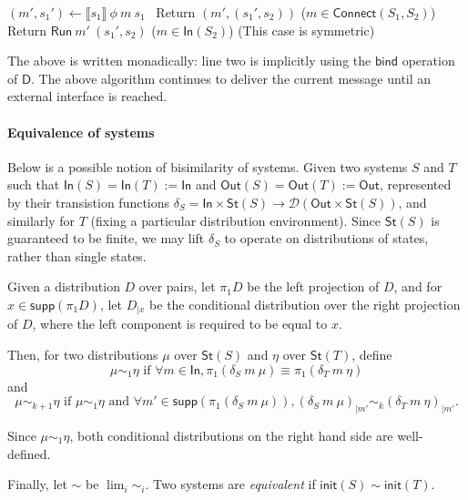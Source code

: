 \documentclass{article}
\begin{document}
\begin{algorithm}
\begin{algorithmic}[1]
        \State $(m', s_1') \leftarrow \llbracket s_1 \rrbracket\ \phi\ m\ s_1$
         \
            \State Return $(m', (s_1', s_2))$
        \Else 
            \State ($m \in \textsf{Connect}(S_1, S_2)$) 
            \State Return $\textsf{Run}\ m'\ (s_1', s_2)$
        \EndIf
    \Else
        \State ($m \in \textsf{In}(S_2)$)
        \State (This case is symmetric)
    \EndIf
\end{algorithmic}
\end{algorithm}

The above is written monadically: line two is implicitly using the $\textsf{bind}$ operation of $\textsf{D}$. The above algorithm continues to deliver the current message until an external interface is reached.


\paragraph{Equivalence of systems}

Below is a possible notion of bisimilarity of systems. Given two systems $S$ and $T$ such that $\textsf{In}(S) = \textsf{In}(T) := \textsf{In}$ and $\textsf{Out}(S) = \textsf{Out}(T) := \textsf{Out}$, represented by their transistion functions $\delta_S = \textsf{In} \times \textsf{St}(S) \to \mathcal{D} (\textsf{Out} \times \textsf{St}(S))$, and similarly for $T$ (fixing a particular distribution environment).
Since $\textsf{St}(S)$ is guaranteed to be finite, we may lift $\delta_S$ to operate on distributions of states, rather than single states.

Given a distribution $D$ over pairs, let $\pi_1 D$ be the left projection of $D$, and for $x \in \textsf{supp}(\pi_1 D)$, let $D_{|x}$ be the conditional distribution over the right projection of $D$, where the left component is required to be equal to $x$.

Then, for two distributions $\mu$ over $\textsf{St}(S)$ and $\eta$ over $\textsf{St}(T)$, define
\[ \mu \sim_1 \eta \text { if } \forall m \in \textsf{In}, \pi_1 (\delta_S\ m\ \mu) \equiv \pi_1 (\delta_T\ m\ \eta)\]
and
\[
    \mu \sim_{k+1} \eta \text { if } \mu \sim_1 \eta \text{ and } \forall m' \in \textsf{supp} (\pi_1 (\delta_S\ m\ \mu)), (\delta_S\ m\ \mu)_{|m'} \sim_k (\delta_T\ m\ \eta)_{|m'}.
\]

Since $\mu \sim_1 \eta$, both conditional distributions on the right hand side are well-defined.

Finally, let $\sim$ be $\lim_i \sim_i$. Two systems are \emph{equivalent} if $\textsf{init}(S) \sim \textsf{init}(T)$.
\end{document}
